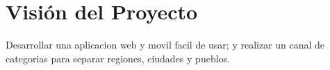 \chapter{Visión del Proyecto}
Desarrollar una aplicacion web y movil facil de usar; y realizar un canal de categorias para separar regiones, ciudades y pueblos.